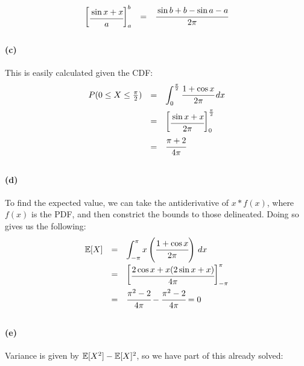 \documentclass[a4paper]{article}
\begin{document}
\begin{equation}
\begin{array}{rcl}
\begin{bmatrix} \cfrac{\sin{x} + x}{a}\end{bmatrix}^{b}_{a} & = & \cfrac{\sin{b} + b - \sin{a} - a}{2\pi}\\[.15in]
\end{array}
\end{equation}

\paragraph{(c)} This is easily calculated given the CDF:
\begin{equation}
\begin{array}{rcl}
P(0 \le X \le \frac{\pi}{2}) & = & \displaystyle\int^{\frac{\pi}{2}}_{0} \cfrac{1+ \cos{x}}{2\pi} \,dx \\[.15in]
& = & \begin{bmatrix} \cfrac{\sin{x} + x}{2\pi}\end{bmatrix}^{\frac{\pi}{2}}_{0} \\[.15in]
& = & \cfrac{\pi + 2}{4\pi} \\[.15in]
\end{array}
\end{equation}

\paragraph{(d)} To find the expected value, we can take the antiderivative of $x * f(x)$, where $f(x)$ is the PDF, and then constrict the bounds to those delineated. Doing so gives us the following:
\begin{equation}
\begin{array}{rcl}
\mathbb{E}[X] & = & \displaystyle\int^{\pi}_{-\pi} x \left( \cfrac{1+ \cos{x}}{2\pi} \right) \,dx \\[.15in]
& = & \begin{bmatrix} \cfrac{2 \cos{x} + x(2 \sin{x} + x)}{4\pi}\end{bmatrix}^{\pi}_{-\pi} \\[.15in]
& = & \cfrac{\pi^2-2}{4\pi} - \cfrac{\pi^2-2}{4\pi} = 0 \\[.15in]
\end{array}
\end{equation}

\paragraph{(e)} Variance is given by $\mathbb{E}[X^2] - \mathbb{E}[X]^2$, so we have part of this already solved:
\end{document}
